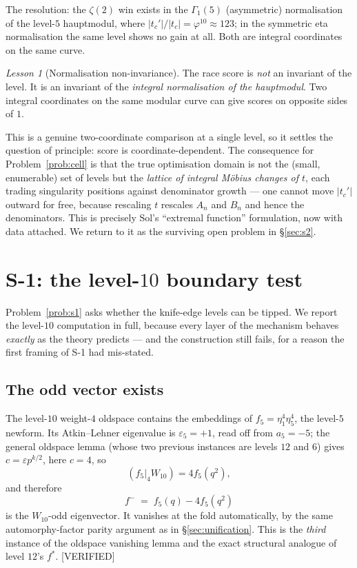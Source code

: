 \documentclass[11pt,reqno]{amsart}
\theoremstyle{plain}
\theoremstyle{definition}
\theoremstyle{remark}
\newtheorem{lesson}[theorem]{Lesson}
\newcommand{\eps}{\varepsilon}
\newcommand{\tc}{t_c}
\newcommand{\tcp}{t_c'}
\newcommand{\Verified}{\textup{\textsf{[VERIFIED]}}}
\begin{document}
The resolution: the $\zeta(2)$ win exists in the $\Gamma_1(5)$
(asymmetric) normalisation of the level-$5$ hauptmodul, where
$|\tcp|/|\tc| = \varphi^{10}\approx123$; in the symmetric eta
normalisation the same level shows no gain at all. Both are integral
coordinates on the same curve.

\begin{lesson}[Normalisation non-invariance]
\label{lesson:norm}
The race score is \emph{not} an invariant of the level. It is an
invariant of the \emph{integral normalisation of the hauptmodul}. Two
integral coordinates on the same modular curve can give scores on
opposite sides of $1$.
\end{lesson}

This is a genuine two-coordinate comparison at a single level, so it
settles the question of principle: score is coordinate-dependent. The
consequence for Problem~\ref{prob:cell} is that the true optimisation
domain is not the (small, enumerable) set of levels but the
\emph{lattice of integral M\"obius changes of $t$}, each trading
singularity positions against denominator growth --- one cannot move
$|\tcp|$ outward for free, because rescaling $t$ rescales $A_n$ and
$B_n$ and hence the denominators. This is precisely Sol's
``extremal function'' formulation, now with data attached. We return to it
as the surviving open problem in \S\ref{sec:s2}.

\section{S-1: the level-$10$ boundary test}
\label{sec:s1}

Problem~\ref{prob:s1} asks whether the knife-edge levels can be tipped.
We report the level-$10$ computation in full, because every layer of the
mechanism behaves \emph{exactly} as the theory predicts --- and the
construction still fails, for a reason the first framing of S-1 had
mis-stated.

\subsection{The odd vector exists}

The level-$10$ weight-$4$ oldspace contains the embeddings of
$f_5=\eta_1^4\eta_5^4$, the level-$5$ newform. Its Atkin--Lehner
eigenvalue is $\eps_5=+1$, read off from $a_5=-5$; the general oldspace
lemma (whose two previous instances are levels $12$ and $6$) gives
$c=\eps p^{k/2}$, here $c=4$, so
\[
  (f_5|_4W_{10}) = 4f_5(q^2),
\]
and therefore
\[
  \boxed{\,f^- \;=\; f_5(q)-4f_5(q^2)\,}
\]
is the $W_{10}$-odd eigenvector. It vanishes at the fold automatically,
by the same automorphy-factor parity argument as in
\S\ref{sec:unification}. This is the \emph{third} instance of the
oldspace vanishing lemma and the exact structural analogue of level
$12$'s $f^{*}$. \Verified
\end{document}
